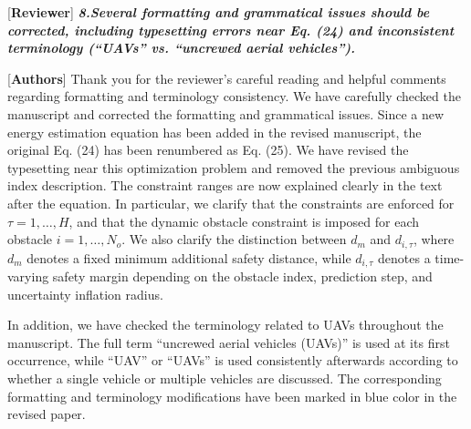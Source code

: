 \documentclass[12pt, twosides]{article}
\theoremstyle{definition}
\begin{document}
\textcolor[rgb]{0.00,0.00,1.00}{[\textbf {Reviewer}]} \textit{\textbf{8.Several formatting and grammatical issues should be corrected, including typesetting errors near Eq. (24) and inconsistent terminology (``UAVs'' vs. ``uncrewed aerial vehicles'').}}

\textcolor[rgb]{0.00,0.00,1.00}{[\textbf{Authors}]} Thank you for the reviewer's careful reading and helpful comments regarding formatting and terminology consistency. We have carefully checked the manuscript and corrected the formatting and grammatical issues. Since a new energy estimation equation has been added in the revised manuscript, the original Eq. (24) has been renumbered as Eq. (25). We have revised the typesetting near this optimization problem and removed the previous ambiguous index description. The constraint ranges are now explained clearly in the text after the equation. In particular, we clarify that the constraints are enforced for $\tau=1,\ldots,H$, and that the dynamic obstacle constraint is imposed for each obstacle $i=1,\ldots,N_o$. We also clarify the distinction between $d_m$ and $d_{i,\tau}$, where $d_m$ denotes a fixed minimum additional safety distance, while $d_{i,\tau}$ denotes a time-varying safety margin depending on the obstacle index, prediction step, and uncertainty inflation radius.

In addition, we have checked the terminology related to UAVs throughout the manuscript. The full term ``uncrewed aerial vehicles (UAVs)'' is used at its first occurrence, while ``UAV'' or ``UAVs'' is used consistently afterwards according to whether a single vehicle or multiple vehicles are discussed. The corresponding formatting and terminology modifications have been marked in blue color in the revised paper.
\end{document}
